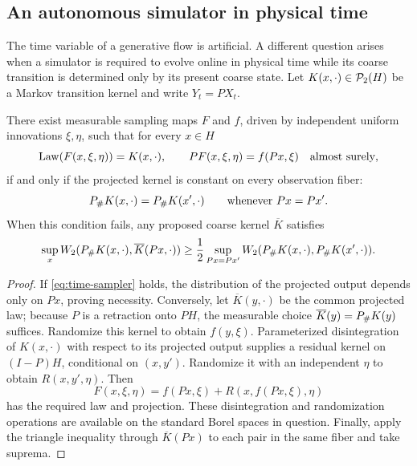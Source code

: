 \subsection{An autonomous simulator in physical time}
The time variable of a generative flow is artificial. A different question arises when a simulator is required to evolve online in physical time while its coarse transition is determined only by its present coarse state. Let $K(x,\cdot)\in\mathcal P_2(H)$ be a Markov transition kernel and write $Y_t=PX_t$.

\begin{theorem}\label{thm:time}
There exist measurable sampling maps $F$ and $f$, driven by independent uniform innovations $\xi,\eta$, such that for every $x\in H$
\begin{equation}\label{eq:time-sampler}
 \operatorname{Law}(F(x,\xi,\eta))=K(x,\cdot),\qquad
 PF(x,\xi,\eta)=f(Px,\xi)\quad\text{almost surely},
\end{equation}
if and only if the projected kernel is constant on every observation fiber:
\begin{equation}\label{eq:lumpability}
 P_{\#} K(x,\cdot)=P_{\#} K(x',\cdot)\qquad\text{whenever }Px=Px'.
\end{equation}
When this condition fails, any proposed coarse kernel $\overline K$ satisfies
\begin{equation}\label{eq:time-radius}
 \sup_x W_2(P_{\#} K(x,\cdot),\overline K(Px,\cdot))
 \ge\frac12\sup_{Px=Px'}W_2(P_{\#} K(x,\cdot),P_{\#} K(x',\cdot)).
\end{equation}
\end{theorem}
\begin{proof}
If \eqref{eq:time-sampler} holds, the distribution of the projected output depends only on $Px$, proving necessity. Conversely, let $\overline K(y,\cdot)$ be the common projected law; because $P$ is a retraction onto $PH$, the measurable choice $\overline K(y)=P_{\#} K(y)$ suffices. Randomize this kernel to obtain $f(y,\xi)$. Parameterized disintegration of $K(x,\cdot)$ with respect to its projected output supplies a residual kernel on $(I-P)H$, conditional on $(x,y')$. Randomize it with an independent $\eta$ to obtain $R(x,y',\eta)$. Then
\[
 F(x,\xi,\eta)=f(Px,\xi)+R(x,f(Px,\xi),\eta)
\]
has the required law and projection. These disintegration and randomization operations are available on the standard Borel spaces in question. Finally, apply the triangle inequality through $\overline K(Px)$ to each pair in the same fiber and take suprema.
\end{proof}

